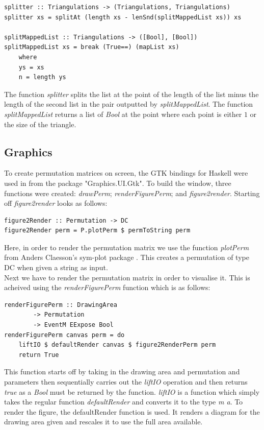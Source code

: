 \documentclass[12pt]{article}
\begin{document}
\begin{lstlisting}
splitter :: Triangulations -> (Triangulations, Triangulations)
splitter xs = splitAt (length xs - lenSnd(splitMappedList xs)) xs

splitMappedList :: Triangulations -> ([Bool], [Bool])
splitMappedList xs = break (True==) (mapList xs)
	where
	ys = xs
	n = length ys 
\end{lstlisting}
The function {\it splitter} splits the list at the point of the length of the list minus the length of the second list in the pair outputted by {\it splitMappedList}. The function {\it splitMappedList} returns a list of {\it Bool} at the point where each point is either $1$ or the size of the triangle.

\subsection{Graphics}
To create permutation matrices on screen, the GTK bindings for Haskell were used in from the package "Graphics.UI.Gtk". To build the window, three functions were created: {\it drawPerm}; {\it renderFigurePerm}; and {\it figure2render}. Starting off {\it figure2render} looks as follows:
\begin{lstlisting}
figure2Render :: Permutation -> DC 
figure2Render perm = P.plotPerm $ permToString perm
\end{lstlisting}
Here, in order to render the permutation matrix we use the function {\it plotPerm} from Anders Claesson's sym-plot package \cite{ClaessonSymPlot}. This creates a permutation of type DC when given a string as input.\\
Next we have to render the permutation matrix in order to visualise it. This is acheived using the {\it renderFigurePerm} function which is as follows:
\begin{lstlisting}
renderFigurePerm :: DrawingArea 
		-> Permutation 
		-> EventM EExpose Bool
renderFigurePerm canvas perm = do
	liftIO $ defaultRender canvas $ figure2RenderPerm perm
	return True
\end{lstlisting}
This function starts off by taking in the drawing area and permutation and parameters then sequentially carries out the {\it liftIO} operation and then returns {\it true} as a {\it Bool} must be returned by the function. {\it liftIO} is a function which simply takes the regular function {\it defaultRender} and converts it to the type {\it m a}. To render the figure, the defaultRender function is used. It renders a diagram for the drawing area given and rescales it to use the full area available.\\
\end{document}
